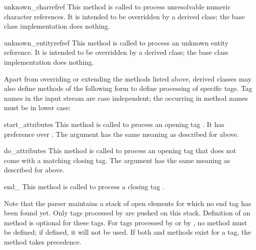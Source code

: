 \begin{funcdesc}{unknown_charref}{ref}
This method is called to process unresolvable numeric character
references.  It is intended to be overridden by a derived class; the
base class implementation does nothing.
\end{funcdesc}

\begin{funcdesc}{unknown_entityref}{ref}
This method is called to process an unknown entity reference.  It is
intended to be overridden by a derived class; the base class
implementation does nothing.
\end{funcdesc}

Apart from overriding or extending the methods listed above, derived
classes may also define methods of the following form to define
processing of specific tags.  Tag names in the input stream are case
independent; the  occurring in method names must be in lower
case:

\begin{funcdescni}{start_}{attributes}
This method is called to process an opening tag .  It has
preference over .  The  argument
has the same meaning as described for  above.
\end{funcdescni}

\begin{funcdescni}{do_}{attributes}
This method is called to process an opening tag  that does
not come with a matching closing tag.  The  argument
has the same meaning as described for  above.
\end{funcdescni}

\begin{funcdescni}{end_}{}
This method is called to process a closing tag .
\end{funcdescni}

Note that the parser maintains a stack of open elements for which no
end tag has been found yet.  Only tags processed by
 are pushed on this stack.  Definition of an
 method is optional for these tags.  For tags
processed by  or by , no
 method must be defined; if defined, it will not
be used.  If both  and 
methods exist for a tag, the  method takes
precedence.
